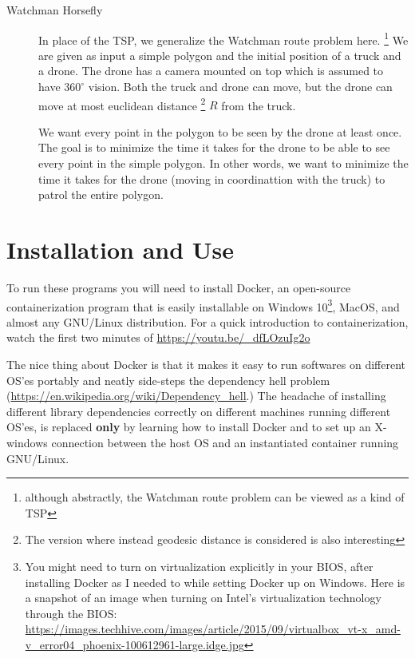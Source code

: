 \documentclass[12pt]{report}
\begin{document}
\begin{description}
\item[Watchman Horsefly] In place of the TSP, we generalize the Watchman route problem here. 
  \footnote{ although abstractly, the Watchman route problem can be viewed as a kind of TSP}
  We are given as input a simple polygon and the initial position of a truck and a drone. The drone has 
  a camera mounted on top which is assumed to have $360^{\circ}$ vision. Both the truck and drone can move, 
  but the drone can move at most euclidean distance \footnote{The version where instead geodesic distance is 
    considered is also interesting} $R$ from the truck. 

  We want every point in the polygon to be seen by the drone at least once. The goal is to minimize the time it 
  takes for the drone to be able to see every point in the simple polygon. In other words, we want to minimize
  the time it takes for the drone (moving in coordinattion with the truck) to patrol the entire polygon. 
  
\end{description}

\chapter{Installation and Use}

To run these programs you will need to install Docker, an open-source containerization program that is easily installable on 
  Windows 10\footnote{You might need to turn on virtualization explicitly in your BIOS, after installing Docker 
  as I needed to while setting Docker up on Windows. Here is a snapshot of an image when turning on Intel's 
  virtualization technology through the BIOS: 
\url{https://images.techhive.com/images/article/2015/09/virtualbox_vt-x_amd-v_error04_phoenix-100612961-large.idge.jpg}}, MacOS, and almost any 
  GNU/Linux distribution. For a quick introduction to containerization, watch the first two minutes of 
  \url{https://youtu.be/_dfLOzuIg2o}

The nice thing about Docker is that it makes it easy to run softwares on different OS'es portably and neatly side-steps the 
dependency hell problem (\url{https://en.wikipedia.org/wiki/Dependency_hell}.) The headache of installing different library 
dependencies correctly on different machines running different OS'es, is replaced \textbf{only} by learning how to 
install Docker and to set up an X-windows connection between the host OS and an instantiated container running GNU/Linux. 
\end{document}

